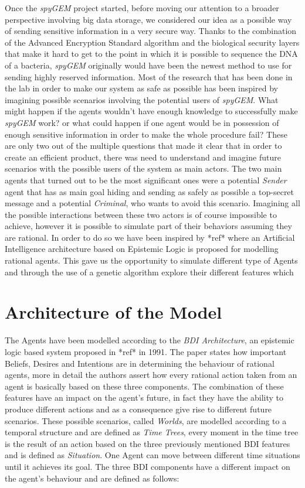 \documentclass[a4paper]{article}
\begin{document}
Once the \textit{spyGEM} project started, before moving our attention to a broader perspective involving big data storage, we considered our idea as a possible way of sending sensitive information in a very secure way. Thanks to the combination of the Advanced Encryption Standard algorithm and the biological security layers that make it hard to get to the point in which it is possible to sequence the DNA of a bacteria, \textit{spyGEM} originally would have been the newest method to use for sending highly reserved information. Most of the research that has been done in the lab in order to make our system as safe as possible has been inspired by imagining possible scenarios involving the potential users of \textit{spyGEM}. What might happen if the agents wouldn't have enough knowledge to successfully make \textit{spyGEM} work? or what could happen if one agent would be in possession of enough sensitive information in order to make the whole procedure fail? These are only two out of the multiple questions that made it clear that in order to create an efficient product, there was need to understand and imagine future scenarios with the possible users of the system as main actors. The two main agents that turned out to be the most significant ones were a potential \textit{Sender} agent that has as main goal hiding and sending as safely as possible a top-secret message and a potential \textit{Criminal}, who wants to avoid this scenario. Imagining all the possible interactions between these two actors is of course impossible to achieve, however it is possible to simulate part of their behaviors assuming they are rational. In order to do so we have been inspired by *ref* where an Artificial Intelligence architecture based on Epistemic Logic is proposed for modelling rational agents. This gave us the opportunity to simulate different type of Agents and through the use of a genetic algorithm explore their different features which                

\section{Architecture of the Model}

The Agents have been modelled according to the \textit{BDI Architecture}, an epistemic logic based system proposed in *ref* in 1991. The paper states how important Beliefs, Desires and Intentions are in determining the behaviour of rational agents, more in detail the authors assert how every rational action taken from an agent is basically based on these three components. The combination of these features have an impact on the agent's future, in fact they have the ability to produce different actions and as a consequence give rise to different future scenarios. These possible scenarios, called \textit{Worlds}, are modelled according to a temporal structure and are defined as \textit{Time Trees}, every moment in the time tree is the result of an action based on the three previously mentioned BDI features and is defined as \textit{Situation}. One Agent can move between different time situations until it achieves its goal. The three BDI components have a different impact on the agent's behaviour and are defined as follows: 
\end{document}
